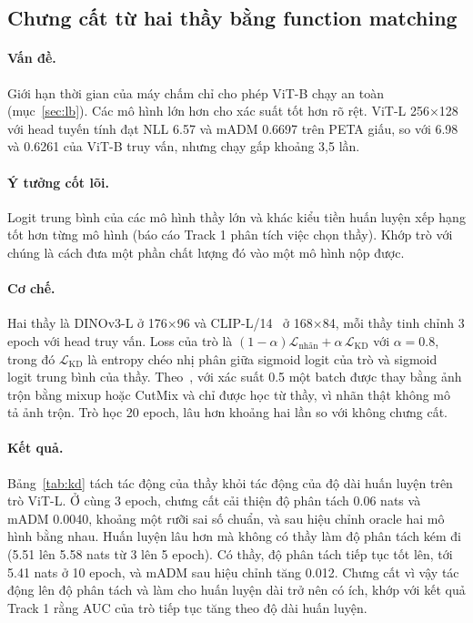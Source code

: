 \documentclass[11pt,a4paper]{article}
\begin{document}
\subsection{Chưng cất từ hai thầy bằng function matching}
\label{sec:kd}

\paragraph{Vấn đề.} Giới hạn thời gian của máy chấm chỉ cho phép ViT-B chạy an toàn (mục~\ref{sec:lb}). Các mô hình lớn hơn cho xác suất tốt hơn rõ rệt. ViT-L 256×128 với head tuyến tính đạt NLL 6.57 và mADM 0.6697 trên PETA giấu, so với 6.98 và 0.6261 của ViT-B truy vấn, nhưng chạy gấp khoảng 3,5 lần.

\paragraph{Ý tưởng cốt lõi.} Logit trung bình của các mô hình thầy lớn và khác kiểu tiền huấn luyện xếp hạng tốt hơn từng mô hình (báo cáo Track 1 phân tích việc chọn thầy). Khớp trò với chúng là cách đưa một phần chất lượng đó vào một mô hình nộp được.

\paragraph{Cơ chế.} Hai thầy là DINOv3-L ở 176×96 và CLIP-L/14~\cite{clip} ở 168×84, mỗi thầy tinh chỉnh 3 epoch với head truy vấn. Loss của trò là $(1-\alpha)\mathcal{L}_{\text{nhãn}}+\alpha\,\mathcal{L}_{\text{KD}}$ với $\alpha=0.8$, trong đó $\mathcal{L}_{\text{KD}}$ là entropy chéo nhị phân giữa sigmoid logit của trò và sigmoid logit trung bình của thầy. Theo~\cite{patient}, với xác suất 0.5 một batch được thay bằng ảnh trộn bằng mixup hoặc CutMix và chỉ được học từ thầy, vì nhãn thật không mô tả ảnh trộn. Trò học 20 epoch, lâu hơn khoảng hai lần so với không chưng cất.

\paragraph{Kết quả.} Bảng~\ref{tab:kd} tách tác động của thầy khỏi tác động của độ dài huấn luyện trên trò ViT-L. Ở cùng 3 epoch, chưng cất cải thiện độ phân tách 0.06 nats và mADM 0.0040, khoảng một rưỡi sai số chuẩn, và sau hiệu chỉnh oracle hai mô hình bằng nhau. Huấn luyện lâu hơn mà không có thầy làm độ phân tách kém đi (5.51 lên 5.58 nats từ 3 lên 5 epoch). Có thầy, độ phân tách tiếp tục tốt lên, tới 5.41 nats ở 10 epoch, và mADM sau hiệu chỉnh tăng 0.012. Chưng cất vì vậy tác động lên độ phân tách và làm cho huấn luyện dài trở nên có ích, khớp với kết quả Track 1 rằng AUC của trò tiếp tục tăng theo độ dài huấn luyện.
\end{document}
